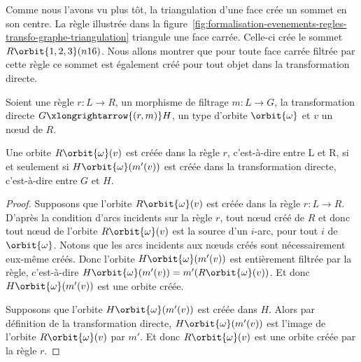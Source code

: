 
Comme nous l'avons vu plus tôt, la triangulation d'une face crée un sommet en
son centre. %
La règle illustrée dans la
figure~\ref{fig:formalisation-evenements-regles-transfo-graphe-triangulation}
triangule une face carrée. %
Celle-ci crée le sommet $R\orbit{1,2,3}(n16)$. %
Nous allons montrer que pour toute face carrée filtrée par cette règle ce sommet
est également créé pour tout objet dans la transformation directe. %

\begin{proposition}\label{prop:base-rule-create}
	Soient une règle $r : L \longrightarrow R$, un morphisme de filtrage $m : L \rightarrow G$, la
	transformation directe $G \xlongrightarrow{(r,m)} H$, un type d'orbite
	$\orbit{\omega}$ et $v$ un n\oe ud de $R$. %

	Une orbite $R\orbit{\omega}(v)$ est créée dans la règle $r$, c'est-à-dire entre L
	et R, si et seulement si $H\orbit{\omega}(m'(v))$ est créée dans la
	transformation directe, c'est-à-dire entre $G$ et $H$. %
\end{proposition}

\begin{proof}
	Supposons que l'orbite $R\orbit{\omega}(v)$ est créée dans la règle $r : L \longrightarrow
		R$. %
	D'après la condition d'arcs incidents sur la règle $r$, tout n\oe ud créé de
	$R$ et donc tout n\oe ud de l'orbite $R\orbit{\omega}(v)$ est la source d'un
	$i$-arc, pour tout $i$ de $\orbit{\omega}$. %
	Notons que les arcs incidents aux n\oe uds créés sont nécessairement eux-même
	créés. %
	Donc l'orbite $H\orbit{\omega}(m'(v))$ est entièrement filtrée par la règle,
	c'est-à-dire $H\orbit{\omega}(m'(v)) = m'(R\orbit{\omega}(v))$. %
	Et donc $H\orbit{\omega}(m'(v))$ est une orbite créée. %

	Supposons que l'orbite $H\orbit{\omega}(m'(v))$ est créée dans $H$. Alors par
	définition de la transformation directe, $H\orbit{\omega}(m'(v))$ est l'image de
	l'orbite $R\orbit{\omega}(v)$ par $m'$. %
	Et donc $R\orbit{\omega}(v)$ est une orbite créée par la règle $r$. %
\end{proof}

